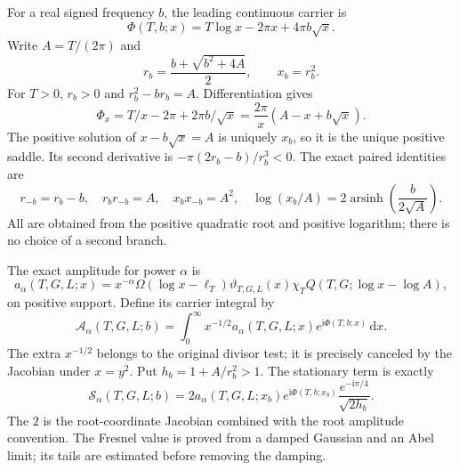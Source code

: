 \documentclass[11pt,a4paper]{article}
\numberwithin{equation}{section}
\theoremstyle{definition}
\newcommand{\dd}{\,\mathrm d}
\newcommand{\ii}{\mathrm i}
\newcommand{\arsinh}{\operatorname{arsinh}}
\begin{document}
For a real signed frequency $b$, the leading continuous carrier is
\[
 \Phi(T,b;x)=T\log x-2\pi x+4\pi b\sqrt x.
\]
Write $A=T/(2\pi)$ and
\[
 r_b=\frac{b+\sqrt{b^2+4A}}2,\qquad x_b=r_b^2.
\]
For $T>0$, $r_b>0$ and $r_b^2-br_b=A$. Differentiation gives
\[
 \Phi_x=T/x-2\pi+2\pi b/\sqrt x
         =\frac{2\pi}{x}(A-x+b\sqrt x).
\]
The positive solution of $x-b\sqrt x=A$ is uniquely $x_b$, so it is the
unique positive saddle. Its second derivative is
$-\pi(2r_b-b)/r_b^3<0$. The exact paired identities are
\[
 r_{-b}=r_b-b,\quad r_br_{-b}=A,\quad x_bx_{-b}=A^2,\quad
 \log(x_b/A)=2\arsinh\!\left(\frac b{2\sqrt A}\right).
\]
All are obtained from the positive quadratic root and positive logarithm;
there is no choice of a second branch.

The exact amplitude for power $\alpha$ is
\[
 a_\alpha(T,G,L;x)=x^{-\alpha}\Omega(\log x-\ell_T)
       \vartheta_{T,G,L}(x)\chi_TQ(T,G;\log x-\log A),
\]
on positive support. Define its carrier integral by
\[
 \mathcal A_\alpha(T,G,L;b)
       =\int_0^\infty x^{-1/2}a_\alpha(T,G,L;x)e^{\ii\Phi(T,b;x)}\dd x.
\]
The extra $x^{-1/2}$ belongs to the original divisor test; it is precisely
canceled by the Jacobian under $x=y^2$.
Put $h_b=1+A/r_b^2>1$. The stationary term is exactly
\begin{equation*}
 \mathcal S_\alpha(T,G,L;b)=
 2a_\alpha(T,G,L;x_b)e^{\ii\Phi(T,b;x_b)}
             \frac{e^{-\ii\pi/4}}{\sqrt{2h_b}}.
\end{equation*}
The $2$ is the root-coordinate Jacobian combined with the root
amplitude convention. The Fresnel value is proved from a damped Gaussian and
an Abel limit; its tails are estimated before removing the damping.
\end{document}
